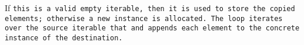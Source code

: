 If \tt{this} is a valid empty iterable, then it is used to store
the copied elements; otherwise a new instance is allocated.
The loop iterates over the source iterable \tt{that} and appends
each element to the concrete instance of the destination.
